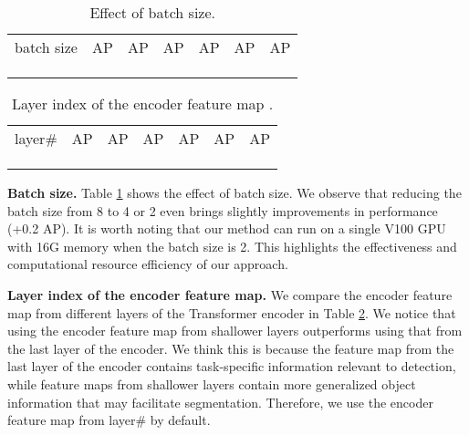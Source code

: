 \documentclass[10pt,twocolumn,letterpaper]{article}
\begin{document}
\begin{table}[t]
\begin{minipage}[t]{1\linewidth}
\centering
\setlength{\tabcolsep}{8pt}
\footnotesize
\renewcommand{\arraystretch}{1.3}
\resizebox{1.0\linewidth}{!}
{
\begin{tabular}{c|cccccc}
     batch size & AP & AP & AP & AP & AP & AP  \\
    \shline
    &  &  &  &  &  &  \\ 
    &  &  &  &  &  &  \\
    &  &  &  &  &  &  \\
\end{tabular}

}
\caption{\small{{
Effect of batch size.}}
}
\label{tab:effect_batch_size}
\end{minipage}
\end{table}

\begin{table}[t]
\begin{minipage}[t]{1\linewidth}
\centering
\setlength{\tabcolsep}{8pt}
\footnotesize
\renewcommand{\arraystretch}{1.2}
\resizebox{1.0\linewidth}{!}
{
\begin{tabular}{c|cccccc}
     layer\# & AP & AP & AP & AP & AP & AP  \\
    \shline
    &  &  &  &  &  &  \\ 
    &  &  &  &  &  &  \\
    &  &  &  &  &  &  \\
\end{tabular}

}
\caption{\small{{
Layer index of the encoder feature map .
}}
}
\label{tab:feat_fetch_layer}
\end{minipage}
\end{table}


\vspace{1mm}
\noindent\textbf{Batch size.}
Table \ref{tab:effect_batch_size} shows the effect of batch size. We observe that reducing the batch size from 8 to 4 or 2 even brings slightly improvements in performance (+0.2 AP). It is worth noting that our method can run on a single V100 GPU with 16G memory when the batch size is 2.
This highlights the effectiveness and computational resource efficiency of our approach.

\vspace{1mm}
\noindent\textbf{Layer index of the encoder feature map.}
We compare the encoder feature map  from different layers of the Transformer encoder in Table \ref{tab:feat_fetch_layer}. We notice that using the encoder feature map from shallower layers outperforms using that from the last layer of the encoder. We think this is because the feature map from the last layer of the encoder contains task-specific information relevant to detection, while feature maps from shallower layers contain more generalized object information that may facilitate segmentation. Therefore, we use the encoder feature map from layer\# by default.
\end{document}
